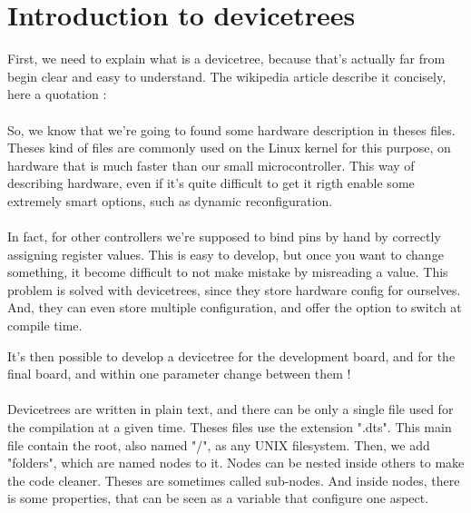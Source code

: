 \section{Introduction to devicetrees}
First, we need to explain what is a devicetree, because that's actually far from begin clear and easy to understand.
The wikipedia article describe it concisely, here a quotation :

    \cite{devicetree}

\paragraph{}
So, we know that we're going to found some hardware description in theses files. Theses kind of files are 
commonly used on the Linux kernel for this purpose, on hardware that is much faster than our small 
microcontroller. 
This way of describing hardware, even if it's quite difficult to get it rigth enable some extremely smart
options, such as dynamic reconfiguration.

\paragraph{}
In fact, for other controllers we're supposed to bind pins by hand by correctly assigning register values.
This is easy to develop, but once you want to change something, it become difficult to not make mistake by 
misreading a value.
This problem is solved with devicetrees, since they store hardware config for ourselves. And, they can 
even store multiple configuration, and offer the option to switch at compile time.

It's then possible to develop a devicetree for the development board, and for the final board, and within
one parameter change between them !

\paragraph{}
Devicetrees are written in plain text, and there can be only a single file used for the compilation at 
a given time. Theses files use the extension ".dts". This main file contain the root, also named "/", 
as any UNIX filesystem. Then, we add "folders", which are named nodes to it. Nodes can be 
nested inside others to make the code cleaner. Theses are sometimes called sub-nodes. And inside nodes, 
there is some properties, that can be seen as a variable that configure one aspect.

